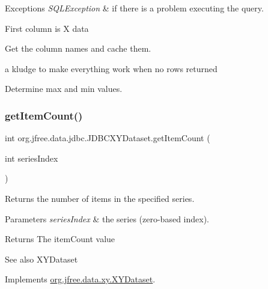 \begin{DoxyExceptions}{Exceptions}
{\em S\+Q\+L\+Exception} & if there is a problem executing the query. \\
\hline
\end{DoxyExceptions}
First column is X data

Get the column names and cache them.

a kludge to make everything work when no rows returned

Determine max and min values. \mbox{\label{classorg_1_1jfree_1_1data_1_1jdbc_1_1_j_d_b_c_x_y_dataset_aab2e36e1765d6e8e80f41faa233fcdfb}} 
\subsubsection{\texorpdfstring{get\+Item\+Count()}{getItemCount()}\hspace{0.1cm}{\footnotesize\ttfamily [1/2]}}
{\footnotesize\ttfamily int org.\+jfree.\+data.\+jdbc.\+J\+D\+B\+C\+X\+Y\+Dataset.\+get\+Item\+Count (\begin{DoxyParamCaption}\item[{int}]{series\+Index }\end{DoxyParamCaption})}

Returns the number of items in the specified series.


\begin{DoxyParams}{Parameters}
{\em series\+Index} & the series (zero-\/based index).\\
\hline
\end{DoxyParams}
\begin{DoxyReturn}{Returns}
The item\+Count value
\end{DoxyReturn}
\begin{DoxySeeAlso}{See also}
X\+Y\+Dataset 
\end{DoxySeeAlso}


Implements \mbox{\hyperlink{interfaceorg_1_1jfree_1_1data_1_1xy_1_1_x_y_dataset_ae81f9de91dfcae45028fc8a486a119da}{org.\+jfree.\+data.\+xy.\+X\+Y\+Dataset}}.

\mbox{\label{classorg_1_1jfree_1_1data_1_1jdbc_1_1_j_d_b_c_x_y_dataset_aa347adfad669f076de8dbb6793441f15}} 
